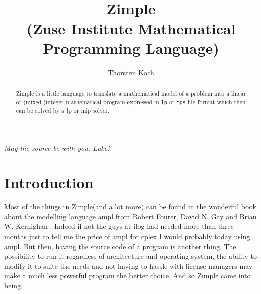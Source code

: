 \documentclass[12pt]{article}
\newcommand{\zimple}{{\sc Zimple}\xspace}
\newcommand{\lp}{{\sc lp}\xspace}
\newcommand{\mip}{{\sc mip}\xspace}
\newcommand{\mps}{{\tt mps}\xspace}
\newcommand{\lpf}{{\tt lp}\xspace}
\newcommand{\ampl}{{\sc ampl}\xspace}
\newcommand{\ilog}{{\sc ilog}\xspace}
\newcommand{\cplex}{{\sc cplex}\xspace}
\begin{document}
\title{
\vspace*{-3cm}\\[\bigskipamount]
\LARGE\zimple\\
\normalsize (Zuse Institute Mathematical Programming Language)}
\author{Thorsten Koch}
\maketitle
\begin{abstract}
\zimple is a little language to translate a mathematical model of a 
problem into a linear or (mixed-)integer mathematical program
expressed in \lpf or \mps file format which then can be solved
by a \lp or \mip solver.
\end{abstract}
\begin{flushright}
{\em May the source be with you, Luke!}
\end{flushright}
\section{Introduction}
Most of the things in \zimple (and a lot more) can be found in 
the wonderful book about the modelling language \ampl 
from Robert Fourer, David N. Gay and Brian W. Kernighan
\cite{FGK93}.
Indeed if not the guys at \ilog had needed more than three months just
to tell me the price of \ampl for \cplex I would probably today using
\ampl.
But then, having the source code of a program is another thing. The
possibility to run it regardless of architecture and operating system, the
ability to modify it to suite the needs and not having to hassle with license
managers may make a much less powerful program the better choice.
And so \zimple came into being.
\end{document}
